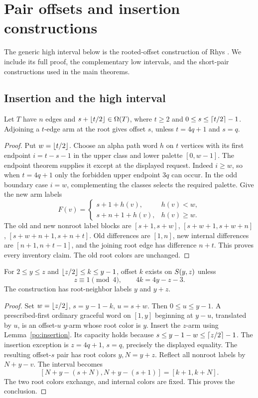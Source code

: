 \section{Pair offsets and insertion constructions}\label{app:pair-offsets}
The generic high interval below is the rooted-offset construction of Rhys \cite[Lemma~5.1]{Rhys2026}. We include its full proof, the complementary low intervals, and the short-pair constructions used in the main theorems.

\subsection{Insertion and the high interval}
\begin{lemma}\label{po:insertion}
Let $T$ have $n$ edges and $s+\left\lfloor t/2\right\rfloor\in\Omega(T)$, where $t\ge2$ and $0\le s\le\left\lceil t/2\right\rceil-1$. Adjoining a $t$-edge arm at the root gives offset $s$, unless $t=4q+1$ and $s=q$.
\end{lemma}
\begin{proof}
Put $w=\left\lfloor t/2\right\rfloor$. Choose an alpha path word $h$ on $t$ vertices with its first endpoint $i=t-s-1$ in the upper class and lower palette $[0,w-1]$. The endpoint theorem supplies it except at the displayed request. Indeed $i\ge w$, so when $t=4q+1$ only the forbidden upper endpoint $3q$ can occur. In the odd boundary case $i=w$, complementing the classes selects the required palette. Give the new arm labels
\[
F(v)=\begin{cases}s+1+h(v),&h(v)<w,\\s+n+1+h(v),&h(v)\ge w.\end{cases}
\]
The old and new nonroot label blocks are
$[s+1,s+w]$, $[s+w+1,s+w+n]$, $[s+w+n+1,s+n+t]$.
Old differences are $[1,n]$, new internal differences are $[n+1,n+t-1]$, and the joining root edge has difference $n+t$. This proves every inventory claim. The old root colors are unchanged.
\end{proof}

\begin{lemma}\label{po:high}
For $2\le y\le z$ and $\left\lfloor z/2\right\rfloor\le k\le y-1$, offset $k$ exists on $S\!\left(y,z\right)$ unless
\[
z\equiv1\pmod4,\qquad 4k=4y-z-3.
\]
The construction has root-neighbor labels $y$ and $y+z$.
\end{lemma}
\begin{proof}
Set $w=\left\lfloor z/2\right\rfloor$, $s=y-1-k$, $u=s+w$. Then $0\le u\le y-1$. A prescribed-first ordinary graceful word on $[1,y]$ beginning at $y-u$, translated by $u$, is an offset-$u$ $y$-arm whose root color is $y$. Insert the $z$-arm using Lemma~\ref{po:insertion}. Its capacity holds because $s\le y-1-w\le\left\lceil z/2\right\rceil-1$. The insertion exception is $z=4q+1$, $s=q$, precisely the displayed equality. The resulting offset-$s$ pair has root colors $y,N=y+z$. Reflect all nonroot labels by $N+y-v$. The interval becomes
\[
[N+y-(s+N),N+y-(s+1)]=[k+1,k+N].
\]
The two root colors exchange, and internal colors are fixed. This proves the conclusion.
\end{proof}

